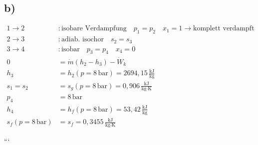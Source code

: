

\subsection*{b)}

\begin{align*}
1 \rightarrow 2 &: \text{isobare Verdampfung} \quad p_1 = p_2 \quad x_1 = 1 \rightarrow \text{komplett verdampft} \\
2 \rightarrow 3 &: \text{adiab. isochor} \quad s_2 = s_3 \\
3 \rightarrow 4 &: \text{isobar} \quad p_3 = p_4 \quad x_4 = 0 \\
0 &= \dot{m} \left( h_2 - h_3 \right) - \dot{W}_k \\
h_3 &= h_2 (p = 8 \, \text{bar}) = 2694{,}15 \, \frac{\text{kJ}}{\text{kg}} \\
s_1 = s_2 &= s_g (p = 8 \, \text{bar}) = 0{,}906 \, \frac{\text{kJ}}{\text{kg} \cdot \text{K}} \\
p_4 &= 8 \, \text{bar} \\
h_4 &= h_f (p = 8 \, \text{bar}) = 53{,}42 \, \frac{\text{kJ}}{\text{kg}} \\
s_f (p = 8 \, \text{bar}) &= s_f = 0{,}3455 \, \frac{\text{kJ}}{\text{kg} \cdot \text{K}}
\end{align*}

```